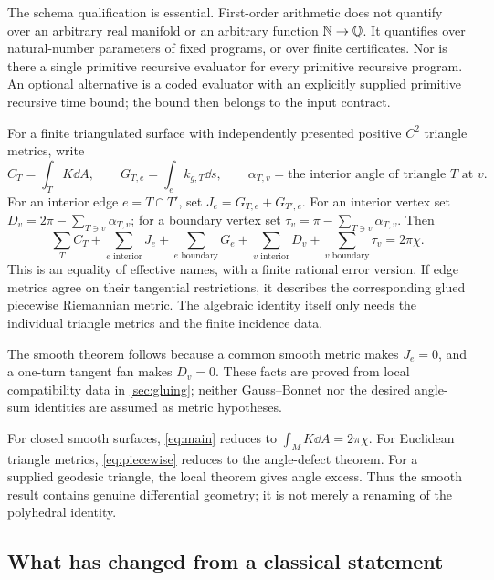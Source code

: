 The schema qualification is essential. First-order arithmetic does not quantify over an arbitrary real manifold or an arbitrary function $\mathbb N\to\mathbb Q$. It quantifies over natural-number parameters of fixed programs, or over finite certificates. Nor is there a single primitive recursive evaluator for every primitive recursive program. An optional alternative is a coded evaluator with an explicitly supplied primitive recursive time bound; the bound then belongs to the input contract.

\begin{theorem}\label{thm:piecewise_intro}
For a finite triangulated surface with independently presented positive $C^2$ triangle metrics, write
\[
C_T=\int_TK\dd A,\qquad
G_{T,e}=\int_e k_{g,T}\dd s,\qquad
\alpha_{T,v}=\text{the interior angle of triangle $T$ at $v$}.
\]
For an interior edge $e=T\cap T'$, set $J_e=G_{T,e}+G_{T',e}$. For an interior vertex set $D_v=2\pi-\sum_{T\ni v}\alpha_{T,v}$; for a boundary vertex set $\tau_v=\pi-\sum_{T\ni v}\alpha_{T,v}$. Then
\begin{equation}\label{eq:piecewise}
\sum_T C_T+\sum_{e\text{ interior}}J_e+
\sum_{e\text{ boundary}}G_e+
\sum_{v\text{ interior}}D_v+
\sum_{v\text{ boundary}}\tau_v=2\pi\chi.
\end{equation}
This is an equality of effective names, with a finite rational error version. If edge metrics agree on their tangential restrictions, it describes the corresponding glued piecewise Riemannian metric. The algebraic identity itself only needs the individual triangle metrics and the finite incidence data.
\end{theorem}

The smooth theorem follows because a common smooth metric makes $J_e=0$, and a one-turn tangent fan makes $D_v=0$. These facts are proved from local compatibility data in \cref{sec:gluing}; neither Gauss--Bonnet nor the desired angle-sum identities are assumed as metric hypotheses.

For closed smooth surfaces, \eqref{eq:main} reduces to $\int_MK\dd A=2\pi\chi$. For Euclidean triangle metrics, \eqref{eq:piecewise} reduces to the angle-defect theorem. For a supplied geodesic triangle, the local theorem gives angle excess. Thus the smooth result contains genuine differential geometry; it is not merely a renaming of the polyhedral identity.

\subsection{What has changed from a classical statement}

